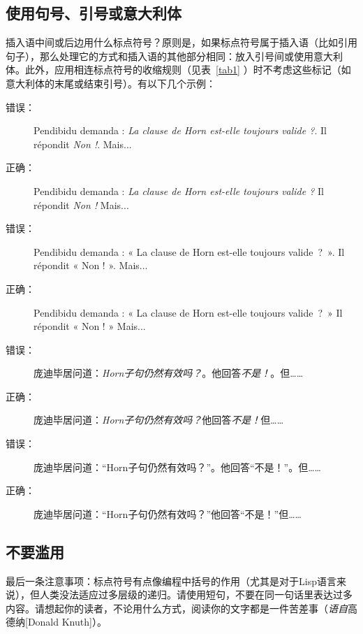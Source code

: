 \subsection{使用句号、引号或意大利体}

插入语中间或后边用什么标点符号？原则是，如果标点符号属于插入语（比如引用句子），那么处理它的方式和插入语的其他部分相同：放入引号间或使用意大利体。此外，应用相连标点符号的收缩规则（见表~\ref{tab1} ）时不考虑这些标记（如意大利体的末尾或结束引号）。有以下几个示例：

\begin{description}
    \item[错误：] Pendibidu demanda : \emph{La clause de Horn est-elle toujours valide ?}. Il répondit \emph{Non !}. Mais...
    \item[正确：] Pendibidu demanda : \emph{La clause de Horn est-elle toujours valide ?} Il répondit \emph{Non !} Mais...
    \item[错误：] Pendibidu demanda : « La clause de Horn est-elle toujours valide~?~». Il répondit « Non ! ». Mais...
    \item[正确：] Pendibidu demanda : « La clause de Horn est-elle toujours valide~?~» Il répondit « Non ! » Mais...
\end{description}

\begin{bil}
    \begin{description}
        \item[错误：]  庞迪毕居问道：\emph{Horn子句仍然有效吗？}。他回答\emph{不是！}。但……
        \item[正确：] 庞迪毕居问道：\emph{Horn子句仍然有效吗？}他回答\emph{不是！}但……
        \item[错误：] 庞迪毕居问道：``Horn子句仍然有效吗？''。他回答``不是！''。但……
        \item[正确：] 庞迪毕居问道：``Horn子句仍然有效吗？''他回答``不是！''但……
    \end{description}
\end{bil}

\subsection{不要滥用}

最后一条注意事项：标点符号有点像编程中括号的作用（尤其是对于Lisp语言来说），但人类没法适应过多层级的递归。请使用短句，不要在同一句话里表达过多内容。请想起你的读者，不论用什么方式，阅读你的文字都是一件苦差事（\emph{语自}高德纳[Donald Knuth]）。